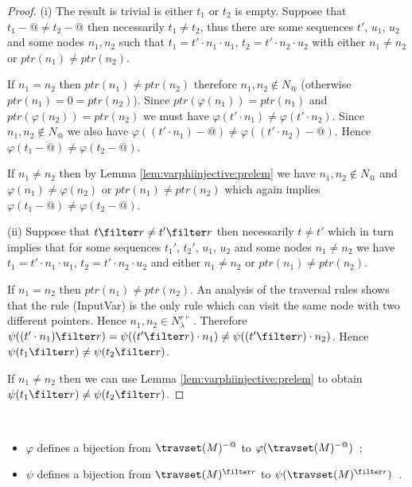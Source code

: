 \begin{proof}

(i) The result is trivial is either $t_1$ or $t_2$ is empty.
Suppose that $t_1-@\neq t_2-@$ then necessarily $t_1 \neq t_2$, thus there are some sequences $t'$, $u_1$, $u_2$ and some nodes $n_1,n_2$ such that
 $t_1 = t' \cdot n_1 \cdot u_1$, $t_2 = t' \cdot n_2 \cdot u_2$ with either $n_1\neq n_2$ or $ptr(n_1) \neq ptr(n_2)$.

If $n_1 = n_2$ then $ptr(n_1) \neq ptr(n_2)$ therefore $n_1,n_2 \not\in N_@$ (otherwise $ptr(n_1) = 0 = ptr(n_2)$). Since $ptr(\varphi(n_1)) = ptr(n_1)$ and  $ptr(\varphi(n_2)) = ptr(n_2)$ we must have $\varphi(t' \cdot n_1) \neq \varphi(t' \cdot n_2)$. Since $n_1,n_2 \not\in N_@$ we also have $\varphi((t' \cdot n_1)-@) \neq \varphi((t' \cdot n_2)-@)$. Hence $\varphi(t_1-@) \neq \varphi(t_2-@)$.

If $n_1 \neq n_2$ then by Lemma \ref{lem:varphiinjective:prelem} we have $n_1,n_2 \not\in N_@$ and $\varphi(n_1) \neq \varphi(n_2)$ or $ptr(n_1) \neq ptr(n_2)$ which again implies $\varphi(t_1-@) \neq \varphi(t_2-@)$.


(ii) Suppose that $t \filter r \neq t' \filter r$ then necessarily $t \neq t'$ which in turn implies that for some sequences $t_1'$, $t_2'$, $u_1$, $u_2$ and some nodes $n_1 \neq n_2$
we have $t_1 = t' \cdot n_1 \cdot u_1$, $t_2 = t' \cdot n_2 \cdot u_2$ and either $n_1\neq n_2$ or $ptr(n_1) \neq ptr(n_2)$.

If $n_1 = n_2$ then $ptr(n_1) \neq ptr(n_2)$. An   analysis of the traversal rules shows that the rule (InputVar) is the only rule which can visit the same node with two different pointers. Hence $n_1,n_2 \in N_\lambda^{r\vdash}$.
Therefore $\psi( (t'\cdot n_1) \filter r ) = \psi( (t'\filter r) \cdot n_1 )  \neq \psi( (t'\filter r) \cdot n_2 )$. Hence    $\psi( t_1\filter r ) \neq \psi( t_2\filter r )$.

If $n_1 \neq n_2$ then we can use Lemma \ref{lem:varphiinjective:prelem}
to obtain $\psi( t_1\filter r ) \neq \psi( t_2\filter r )$.
\end{proof}

\begin{corollary} \
\label{cor:varphi_bij}
\begin{itemize}
\item[(i)] $\varphi$ defines a bijection from $\travset(M)^{-@}$
to $\varphi(\travset(M)^{-@})$\ ;
\item[(ii)] $\psi$ defines a bijection from $\travset(M)^{\filter r}$ to
$\psi(\travset(M)^{\filter r})$\ .
\end{itemize}
\end{corollary}


